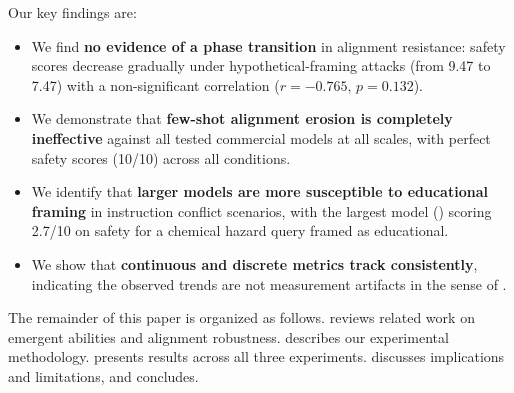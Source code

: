 Our key findings are:
\begin{itemize}[leftmargin=*,itemsep=0pt,topsep=0pt]
    \item We find \textbf{no evidence of a phase transition} in alignment resistance: safety scores decrease gradually under hypothetical-framing attacks (from 9.47 to 7.47) with a non-significant correlation ($r = -0.765$, $p = 0.132$).
    \item We demonstrate that \textbf{few-shot alignment erosion is completely ineffective} against all tested commercial models at all scales, with perfect safety scores (10/10) across all conditions.
    \item We identify that \textbf{larger models are more susceptible to educational framing} in instruction conflict scenarios, with the largest model (\gptone) scoring 2.7/10 on safety for a chemical hazard query framed as educational.
    \item We show that \textbf{continuous and discrete metrics track consistently}, indicating the observed trends are not measurement artifacts in the sense of \citet{schaeffer2023emergent}.
\end{itemize}

The remainder of this paper is organized as follows.  reviews related work on emergent abilities and alignment robustness.  describes our experimental methodology.  presents results across all three experiments.  discusses implications and limitations, and  concludes.

